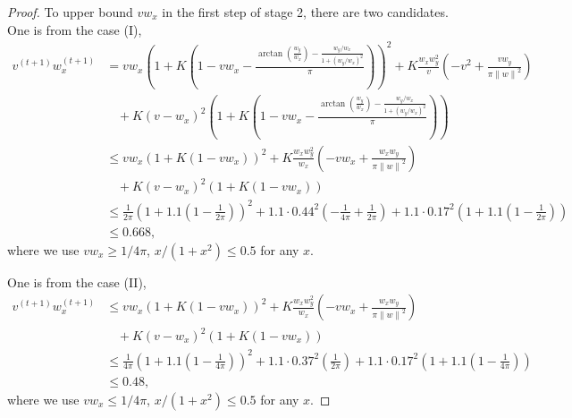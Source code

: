 \documentclass{article}
\theoremstyle{plain}
\theoremstyle{remark}
\newcommand{\norm}[1]{\left\lVert#1\right\rVert}
\def\tt{^{(t+1)}}
\begin{document}
\begin{proof}


To upper bound $v w_x$ in the first step of stage 2, there are two candidates. One is from the case (I), 
\begin{align}
    v\tt w_x\tt &= vw_x\left( 1+K(1-v w_x - \frac{\arctan(\frac{w_y}{w_x})-\frac{w_y/w_x}{1+(w_y/w_x)^2}}{\pi}) \right)^2 + K\frac{w_x w_y^2}{v}\left(-v^2+\frac{v w_y}{\pi\norm{w}^2}\right) \nonumber\\
    & ~~~~ + K(v-w_x)^2\left( 1+K(1-v w_x - \frac{\arctan(\frac{w_y}{w_x})-\frac{w_y/w_x}{1+(w_y/w_x)^2}}{\pi}) \right) \nonumber\\
    &\le vw_x\left( 1+K(1-v w_x)\right)^2 + K\frac{w_x w_y^2}{w_x}\left(-vw_x+\frac{w_x w_y}{\pi\norm{w}^2}\right) \nonumber\\
    & ~~~~ + K(v-w_x)^2\left( 1+K(1-v w_x) \right) \nonumber \\
    &\le \frac{1}{2\pi}\left( 1+1.1(1-\frac{1}{2\pi})\right)^2 + 1.1\cdot 0.44^2\left(-\frac{1}{4\pi}+\frac{1}{2\pi}\right) + 1.1\cdot 0.17^2\left( 1+1.1(1-\frac{1}{2\pi}) \right) \nonumber \\
    &\le 0.668,
\end{align}
where we use $v w_x\ge 1/4\pi$, $x/(1+x^2)\le 0.5$ for any $x$. 

One is from the case (II),
\begin{align}
    v\tt w_x\tt 
    &\le vw_x\left( 1+K(1-v w_x)\right)^2 + K\frac{w_x w_y^2}{w_x}\left(-vw_x+\frac{w_x w_y}{\pi\norm{w}^2}\right) \nonumber\\
    & ~~~~ + K(v-w_x)^2\left( 1+K(1-v w_x) \right) \nonumber \\
    &\le \frac{1}{4\pi}\left( 1+1.1(1-\frac{1}{4\pi})\right)^2 + 1.1\cdot 0.37^2\left(\frac{1}{2\pi}\right) + 1.1\cdot 0.17^2\left( 1+1.1(1-\frac{1}{4\pi}) \right) \nonumber \\
    &\le 0.48,
\end{align}
where we use $v w_x\le 1/4\pi$, $x/(1+x^2)\le 0.5$ for any $x$. 


\end{proof}
\end{document}
